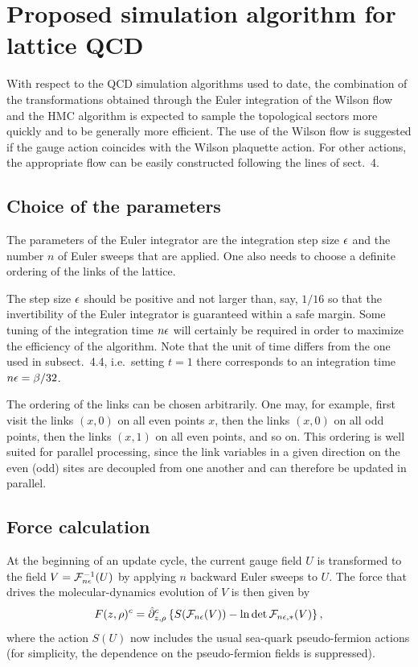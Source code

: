 \section{Proposed simulation algorithm for lattice QCD}

With respect to the QCD simulation algorithms used to date,
the combination of the transformations obtained
through the Euler integration of the Wilson flow
and the HMC algorithm is expected to
sample the topological sectors more quickly
and to be generally more efficient.
The use of the Wilson flow is suggested
if the gauge action coincides with the Wilson
plaquette action. For other actions,
the appropriate flow can be easily constructed
following the lines of sect.~4.


\subsection{Choice of the parameters}

The parameters of the Euler integrator
are the integration step size $\epsilon$ and the number $n$ of
Euler sweeps that are applied. One also needs to choose
a definite ordering of the links of the lattice.

The step size $\epsilon$ should be positive
and not larger than, say, $1/16$ so that
the in\-ver\-ti\-bi\-lity of the
Euler integrator is guaranteed within a safe margin.
Some tuning of the integration time $n\epsilon$
will certainly be required in order to maximize
the efficiency of the algorithm.
Note that the unit of time differs
from the one used in subsect.~4.4, i.e.\ setting $t=1$ there
corresponds to
an integration time $n\epsilon=\beta/32$.

The ordering of the links can be chosen arbitrarily.
One may, for example, first visit the links $(x,0)$
on all even points $x$, then the links $(x,0)$ on
all odd points, then the links $(x,1)$ on all even points,
and so on.
This ordering is well suited for parallel processing,
since the link variables in a given direction on the even (odd) sites
are decoupled from one another and can therefore be updated in parallel.


\subsection{Force calculation}

At the beginning of an update cycle,
the current gauge field
$U$ is transformed to the field $V=\mathcal{F}_{n\epsilon}^{-1}(U)$ by applying
$n$ backward Euler sweeps to $U$.
The force that drives the molecular-dynamics evolution of $V$
is then given by
\begin{equation}
  F(z,\rho)^c=\hat{\partial}^c_{z,\rho}\left\{
  S(\mathcal{F}_{n\epsilon}(V))-\ln\det\mathcal{F}_{n\epsilon,*}(V)\right\},
\end{equation}
where the action $S(U)$ now includes the usual sea-quark pseudo-fermion actions
(for simplicity, the dependence on the
pseudo-fermion fields is suppressed).

